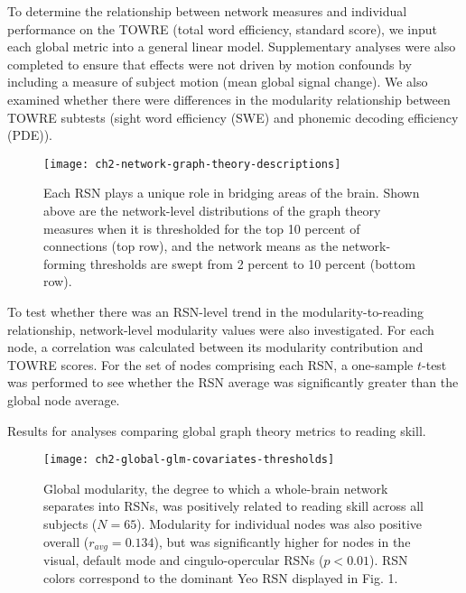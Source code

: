 To determine the relationship between network measures and individual performance on the TOWRE (total word efficiency, standard score), we input each global metric into a general linear model. Supplementary analyses were also completed to ensure that effects were not driven by motion confounds by including a measure of subject motion (mean global signal change). We also examined whether there were differences in the modularity relationship between TOWRE subtests (sight word efficiency (SWE) and phonemic decoding efficiency (PDE)).

\begin{figure}[t]
    \centering
    \texttt{[image: ch2-network-graph-theory-descriptions]}
    \caption[Relationships between network-level graph theory measures.]{Each RSN plays a unique role in bridging areas of the brain. Shown above are the network-level distributions of the graph theory measures when it is thresholded for the top 10 percent of connections (top row), and the network means as the network-forming thresholds are swept from 2 percent to 10 percent (bottom row).}
    \label{fig:ch2-network-graph-theory-descriptions}
\end{figure}

To test whether there was an RSN-level trend in the modularity-to-reading relationship, network-level modularity values were also investigated. For each node, a correlation was calculated between its modularity contribution and TOWRE scores. For the set of nodes comprising each RSN, a one-sample $t$-test was performed to see whether the RSN average was significantly greater than the global node average. 

\begin{table}
	\renewcommand{\tabcolsep}{0.09cm}
	\centering
	
	\caption{Results for analyses comparing global graph theory metrics to reading skill.}
	\label{table:ch2-global-glm-results}
\end{table}

\begin{figure}[t]
    \centering
    \texttt{[image: ch2-global-glm-covariates-thresholds]}
    \caption[Modularity metrics at rest are the best predictors of cognitive skills.] {Global modularity, the degree to which a whole-brain network separates into RSNs, was positively related to reading skill across all subjects ($N = 65$). Modularity for individual nodes was also positive overall ($r_{avg} = 0.134$), but was significantly higher for nodes in the visual, default mode and cingulo-opercular RSNs ($p < 0.01$). RSN colors correspond to the dominant Yeo RSN displayed in Fig. 1.}
    \label{fig:ch2-global-glm-covariates-thresh}
\end{figure}

